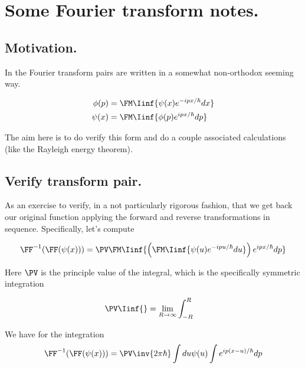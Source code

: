 \chapter{Some Fourier transform notes.}\label{chap:PJqmFourier}

\section{Motivation. }

In \cite{mcmahon2005qmd} the Fourier transform pairs are written in a somewhat 
non-orthodox seeming way.

\begin{align*}
\phi(p) &= \FM \Iinf{\psi(x) e^{-ipx/\hbar} dx} \\
\psi(x) &= \FM \Iinf{\phi(p) e^{ipx/\hbar} dp} \\
\end{align*}

The aim here is to do verify this form and do a couple associated calculations (like the Rayleigh energy theorem).

\section{Verify transform pair. }

As an exercise to verify, in a not particularly rigorous fashion, that we get back our original function applying the forward and reverse transformations
in sequence.  Specifically, let's compute

\begin{align*}
\FF^{-1}(\FF(\psi(x)))
&= \PV \FM \Iinf{\left(\FM \Iinf{\psi(u) e^{-ipu/\hbar} du}\right) e^{ipx/\hbar} dp} \\
\end{align*}

Here $\PV$ is the principle value of the integral, which is the specifically symmetric integration

\begin{align*}
\PV \Iinf{} &= \lim_{R \rightarrow \infty} \int_{-R}^R
\end{align*}

We have for the integration
\begin{align*}
\FF^{-1}(\FF(\psi(x)))
&= \PV \inv{{2\pi\hbar}} \int du \psi(u) \int e^{i p (x-u)/\hbar} dp \\
\end{align*}

